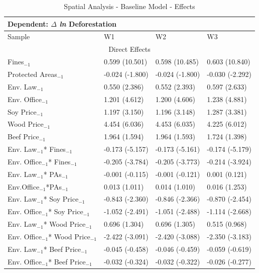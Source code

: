     \begin{table}[htpb!]
\caption{Spatial Analysis - Baseline Model - Effects}
\footnotesize
\centering
       \begin{tabularx}{0.8\textwidth}{l XXX}
     \hline
     \hline
        \multicolumn{4}{l}{Dependent: $\Delta$ \textit{ln} Deforestation}\\ 
        \hline
    Sample & W1 & W2 & W3 \\
        \hline
    \multicolumn{4}{c}{Direct Effects} \\ 
    \hline
    Fines$_{-1}$ & 0.599 (10.501) & 0.598 (10.485) & 0.603 (10.840)\\
    Protected Areas$_{-1}$& -0.024 (-1.800) & -0.024 (-1.800) & -0.030 (-2.292)\\
    Env. Law$_{-1}$ & 0.550 (2.386) & 0.552 (2.393) & 0.597 (2.633)\\
    Env. Office$_{-1}$ & 1.201 (4.612) & 1.200 (4.606) & 1.238 (4.881)\\
    Soy Price$_{-1}$ & 1.197 (3.150) & 1.196 (3.148) & 1.287 (3.381)\\
    Wood Price$_{-1}$ & 4.454 (6.036) & 4.453 (6.035) & 4.225 (6.012)\\
    Beef Price$_{-1}$ & 1.964 (1.594) & 1.964 (1.593) & 1.724 (1.398)\\
    Env. Law$_{-1}$* Fines$_{-1}$ & -0.173 (-5.157) & -0.173 (-5.161) & -0.174 (-5.179)\\
    Env. Office$_{-1}$* Fines$_{-1}$ & -0.205 (-3.784) & -0.205 (-3.773) & -0.214 (-3.924)\\
    Env. Law$_{-1}$* PAs$_{-1}$	& -0.001 (-0.115) & -0.001 (-0.121) & 0.001 (0.121)\\
    Env.Office$_{-1}$*PAs$_{-1}$ & 0.013 (1.011) & 0.014 (1.010) & 0.016 (1.253)\\
    Env. Law$_{-1}$* Soy Price$_{-1}$& -0.843 (-2.360) & -0.846 (-2.366) & -0.870 (-2.454)\\
    Env. Office$_{-1}$* Soy Price$_{-1}$ & -1.052 (-2.491) & -1.051 (-2.488) & -1.114 (-2.668)\\
    Env. Law$_{-1}$* Wood Price$_{-1}$ & 0.696 (1.304) & 0.696 (1.305) & 0.515 (0.968)\\
    Env. Office$_{-1}$* Wood Price$_{-1}$ & -2.422 (-3.091) & -2.420 (-3.088) & -2.350 (-3.183)\\
    Env. Law$_{-1}$* Beef Price$_{-1}$ & -0.045 (-0.458) & -0.046 (-0.459) & -0.059 (-0.619)\\
    Env. Office$_{-1}$* Beef Price$_{-1}$ & -0.032 (-0.324) & -0.032 (-0.322) & -0.026 (-0.277) \\

\end{tabularx}
\end{table}
